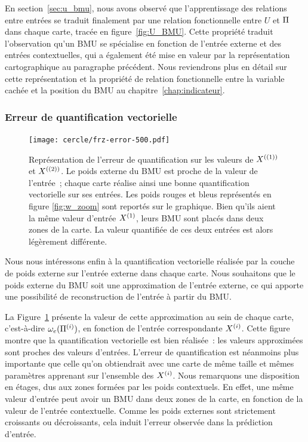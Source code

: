 \documentclass[../main]{subfiles}
\begin{document}
En section~\ref{sec:u_bmu}, nous avons observé que l'apprentissage des relations entre entrées se traduit finalement par une relation fonctionnelle entre $U$ et $\Pi$ dans chaque carte, tracée en figure~\ref{fig:U_BMU}.
Cette propriété traduit l'observation qu'un BMU se spécialise en fonction de l'entrée externe et des entrées contextuelles, qui a également été mise en valeur par la représentation cartographique au paragraphe précédent. Nous reviendrons plus en détail sur cette représentation et la propriété de relation fonctionnelle entre la variable cachée et la position du BMU au chapitre~\ref{chap:indicateur}.

\subsubsection{Erreur de quantification vectorielle}

\begin{figure}
	\centering\texttt{[image: cercle/frz-error-500.pdf]}
	\caption{Représentation de l'erreur de quantification sur les valeurs de $X^{({(1)})}$ et $X^{({(2)})}$. Le poids externe du BMU est proche de la valeur de l'entrée~; chaque carte réalise ainsi une bonne quantification vectorielle sur ses entrées. 
	Les poids rouges et bleus représentés en figure \ref{fig:w_zoom} sont reportés sur le graphique. Bien qu'ils aient la même valeur d'entrée $X^{({1})}$, leurs BMU sont placés dans deux zones de la carte. La valeur quantifiée de ces deux entrées est alors légèrement différente. \label{fig:qv}}
\end{figure}

Nous nous intéressons enfin à la quantification vectorielle réalisée par la couche de poids externe sur l'entrée externe dans chaque carte. Nous souhaitons que le poids externe du BMU soit une approximation de l'entrée externe, ce qui apporte une possibilité de reconstruction de l'entrée à partir du BMU.

La Figure~\ref{fig:qv} présente la valeur de cette approximation au sein de chaque carte, c'est-à-dire $\omega_{e}(\Pi^{({i})})$, en fonction de l'entrée correspondante $X^{({i})}$. 
Cette figure montre que la quantification vectorielle est bien réalisée~: les valeurs approximées sont proches des valeurs d'entrées.
L'erreur de quantification est néanmoins plus importante que celle qu'on obtiendrait avec une carte de même taille et mêmes paramètres apprenant sur l'ensemble des $X^{({i})}$. 
Nous remarquons une disposition en étages, dus aux zones formées par les poids contextuels.
En effet, une même valeur d'entrée peut avoir un BMU dans deux zones de la carte, en fonction de la valeur de l'entrée contextuelle. 
Comme les poids externes sont strictement croissants ou décroissants, cela induit l'erreur observée dans la prédiction d'entrée.
\end{document}
